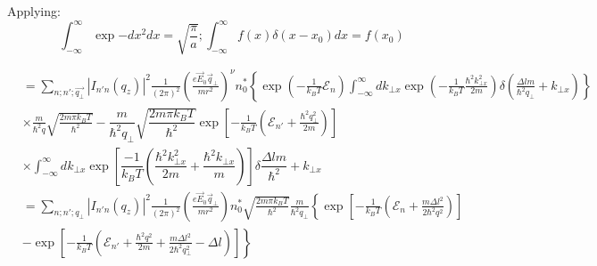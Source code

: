 \documentclass{article}
\begin{document}
Applying: $$\int_{-\infty}^{\infty} \exp{-d x^2} dx = \sqrt{\dfrac{\pi}{a}} ; \int_{-\infty}^\infty f(x)\delta (x-x_0) dx = f(x_0) $$

\begin{align*}
&= \sum_{n; n';\vec{q_{\bot}}} |I_{n'n}(q_z)|^2 \frac{1}{(2\pi)^2} \left( \frac{e \vec{E}_0 \vec{q}_{\bot}}{m r^2} \right)^\nu n_0^* \left\{ \exp\left( -\frac{1}{k_B T} \mathcal{E}_n \right) \int_{-\infty}^{\infty} d k_{\bot x} \exp\left( -\frac{1}{k_B T} \frac{\hbar^2 k_{\bot x}^2}{2m} \right) \delta\left( \frac{\Delta l m}{\hbar^2 q_{\bot}} + k_{\bot x} \right) \right\} \\
&\times \frac{m}{\hbar^2 q} \sqrt{\frac{2m \pi k_B T}{\hbar^2}} - \dfrac{m}{\hbar^2 q_\bot}\sqrt{\dfrac{2m \pi k_B T}{\hbar^2}} \exp\left[ -\frac{1}{k_B T} \left( \mathcal{E}_{n'} + \frac{\hbar^2 q_{\bot}^2}{2m} \right) \right] \\
&\times \int_{-\infty}^{\infty} dk_{\bot x} \exp \left[\dfrac{-1}{k_B T}\left(\dfrac{\hbar^2 k_{\bot x}^2}{2m} + \dfrac{\hbar^2 k_{\bot x}}{m} \right) \right] \delta \dfrac{\Delta l m }{\hbar^2}+k_{\bot x} \\
&= \sum_{n; n'; q_{\bot}} |I_{n'n}(q_z)|^2 \frac{1}{(2\pi)^2} \left( \frac{e \vec{E}_0 \vec{q}_{\bot}}{m r^2} \right) n_0^* \sqrt{\frac{2m \pi k_B T}{\hbar^2}} \frac{m}{\hbar^2 q_{\bot}}  \left\{ \exp\left[ -\frac{1}{k_B T} \left( \mathcal{E}_n + \frac{m \Delta l^2}{2 \hbar^2 q^2} \right) \right] \right.\\
&- \left. \exp\left[ -\frac{1}{k_B T} \left( \mathcal{E}_{n'} + \frac{\hbar^2 q^2}{2m} + \frac{m \Delta l^2}{2 \hbar^2 q_{\bot}^2} - \Delta l \right) \right] \right\}
\end{align*}
\end{document}
